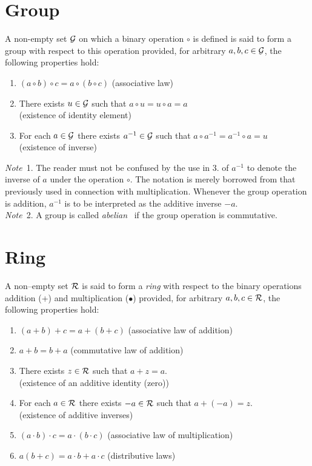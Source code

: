 \documentclass[a4paper]{article}
\theoremstyle{plain} %
{\theorembodyfont{\normalfont}
\newtheorem{Exa}{Example}}
\begin{document}
\appendix

\section{Group}
A non-empty set $\cal G$ on which a binary operation $\circ$ is
defined is said to form a group with respect to this operation
provided, for arbitrary $a,b,c \in \cal G$, the following
properties hold: \cite[p.82]{algebra1}
\begin{enumerate}
 \item $(a \circ b) \circ c = a \circ (b \circ c)$ \hfill
 (associative law)
 \item There exists $u \in \cal G$ such that $a \circ u = u \circ
 a = a$ \\ \mbox{} \hfill (existence of identity element)
 \item For each $a \in \cal G$ there exists $a^{-1} \in \cal G$
 such that $a \circ a^{-1} = a^{-1} \circ a = u$ \\
 \mbox{} \hfill (existence of inverse)
\end{enumerate}

{\em Note}~1. The reader must not be confused by the use in 3. of
$a^{-1}$ to denote the inverse of $a$ under the operation $\circ$.
The notation is merely borrowed from that previously used in
connection with multiplication. Whenever the group operation is
addition, $a^{-1}$ is to be interpreted as the additive inverse
$-a$.\\

{\em Note}~2. A group is called {\em abelian}~ if the group
operation is commutative.

\section{Ring}
A non--empty set $\cal R$ is said to form a {\em ring} with
respect to the binary operations addition (+) and multiplication
($\bullet$) provided, for arbitrary $a,b,c \in \cal R$, the
following properties hold:  \cite[p.101]{algebra1}
\begin{enumerate}
  \item $(a+b)+c = a+(b+c)$ \hfill (associative law of addition)
  \item $a+b = b+a$ \hfill (commutative law of addition)
  \item There exists $z \in \cal R$ such that $a+z=a$.\\ \mbox{} \hfill
  (existence of an additive identity (zero))
  \item For each $a \in \cal R$ there exists $-a \in \cal R$ such
  that $a+(-a)=z$.\\ \mbox{} \hfill (existence of additive inverses)
  \item $(a \cdot b)\cdot c = a \cdot (b \cdot c)$ \hfill
  (associative law of multiplication)
  \item $a(b+c) = a \cdot b + a \cdot c$ \hfill (distributive
  laws)
\end{enumerate}
\end{document}
